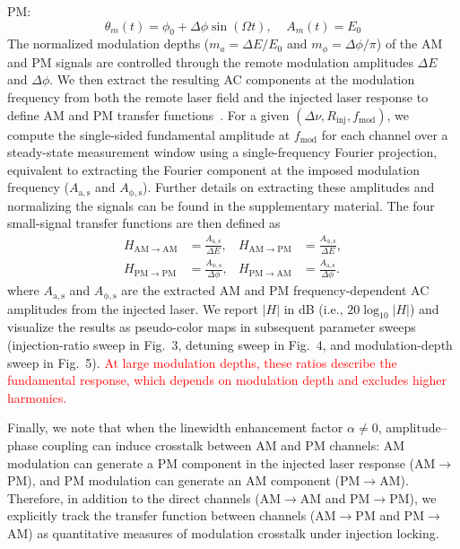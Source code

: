 \documentclass[%
 aip,
 apl,
 amsmath,amssymb,
 reprint,%
 floatfix,
]{revtex4-1}
\begin{document}
PM:
\begin{equation}
\theta_m(t) = \phi_0 + \Delta\phi \sin(\Omega t), \ \ \ \ \
A_m(t) = E_{0}
\end{equation}
The normalized modulation depths ($m_{a}=\Delta E/E_{0}$ and $m_\phi=\Delta\phi/\pi$) of the AM and PM signals are controlled through the remote modulation amplitudes $\Delta E$ and $\Delta\phi$. We then extract the resulting AC components at the modulation frequency from both the remote laser field and the injected laser response to define AM and PM transfer functions~\cite{LiuSlavik2020OILTutorial}. For a given $(\Delta\nu, R_{\mathrm{inj}}, f_{\mathrm{mod}})$, we compute the single-sided fundamental amplitude at $f_{\mathrm{mod}}$ for each channel over a steady-state measurement window using a single-frequency Fourier projection, equivalent to extracting the Fourier component at the imposed modulation frequency ($A_{\mathrm{a,s}}$ and $A_{\mathrm{\phi,s}}$). Further details on extracting these amplitudes and normalizing the signals can be found in the supplementary material. The four small-signal transfer functions are then defined as
\begin{align}
H_{\mathrm{AM\to AM}} &= \frac{A_{\mathrm{a,s}}}{\Delta E}, &
H_{\mathrm{AM\to PM}} &= \frac{A_{\mathrm{\phi,s}}}{\Delta E}, \\
H_{\mathrm{PM\to PM}} &= \frac{A_{\mathrm{\phi,s}}}{\Delta\phi}, &
H_{\mathrm{PM\to AM}} &= \frac{A_{\mathrm{a,s}}}{\Delta\phi}.
\end{align}
where $A_{\mathrm{a,s}}$ and $A_{\mathrm{\phi,s}}$ are the extracted AM and PM frequency-dependent AC amplitudes from the injected laser. We report $|H|$ in dB (i.e., $20\log_{10}|H|$) and visualize the results as pseudo-color maps in subsequent parameter sweeps (injection-ratio sweep in Fig.~3, detuning sweep in Fig.~4, and modulation-depth sweep in Fig.~5).
\textcolor{red}{At large modulation depths, these ratios describe the fundamental response, which depends on modulation depth and excludes higher harmonics.}

Finally, we note that when the linewidth enhancement factor $\alpha \neq 0$, amplitude--phase coupling can induce crosstalk between AM and PM channels: AM modulation can generate a PM component in the injected laser response (AM$\to$PM), and PM modulation can generate an AM component (PM$\to$AM). Therefore, in addition to the direct channels (AM$\to$AM and PM$\to$PM), we explicitly track the transfer function between channels (AM$\to$PM and PM$\to$AM) as quantitative measures of modulation crosstalk under injection locking.
\end{document}
